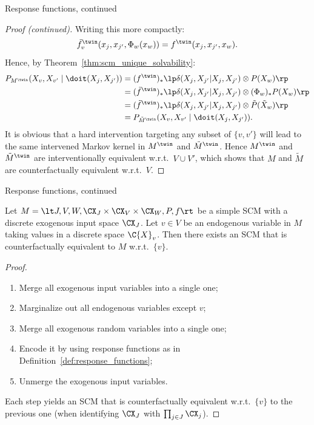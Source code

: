 \begin{frame}{Response functions, continued}
  \begin{proof}[Proof (continued)]
  Writing this more compactly:
  $$\tilde{f}^\twin_v(x_j,x_{j'},\Phi_w(x_w)) = f^\twin(x_j,x_{j'},x_w).$$
  Hence, by Theorem~\ref{thm:scm_unique_solvability}: 
  \begin{align*}
    P_{M^\twin}(X_v,X_{v'} \mid \doit(X_j,X_{j'})) & = (f^\twin)_* \lp \delta(X_j,X_{j'}|X_j,X_{j'}) \otimes P(X_w)\rp \\
    & = (\tilde{f}^\twin)_* \lp \delta(X_j,X_{j'}|X_j,X_{j'}) \otimes (\Phi_w)_* P(X_w) \rp \\
    & = (\tilde{f}^\twin)_* \lp \delta(X_j,X_{j'}|X_j,X_{j'}) \otimes \tilde{P}(\tilde{X}_w) \rp \\
    & = P_{\tilde{M}^\twin}(X_v,X_{v'} \mid \doit(X_j,X_{j'})).
  \end{align*}
  It is obvious that a hard intervention targeting any subset of $\{v,v'\}$ will lead to the same intervened Markov kernel in $M^\twin$ and $\tilde{M}^\twin$.
  Hence $M^\twin$ and $\tilde{M}^\twin$ are interventionally equivalent w.r.t.\ $V \cup V'$, which shows that $M$ and $\tilde{M}$ are counterfactually equivalent w.r.t.\ $V$.
\end{proof}
\end{frame}

\begin{frame}{Response functions, continued}
\begin{Cor}[\ref{cor:counterfactual_equivalence_response_functions}]
  Let $M = \lt J, V, W, \CX_J \times \CX_V \times \CX_W, P, f \rt$ be a simple SCM with a discrete exogenous input space $\CX_J$.
  Let $v \in V$ be an endogenous variable in $M$ taking values in a discrete space $\C{X}_v$.
  Then there exists an SCM that is counterfactually equivalent to $M$ w.r.t.\ $\{v\}$.
\end{Cor}
\begin{proof}
  \begin{enumerate}
    \item Merge all exogenous input variables into a single one;
    \item Marginalize out all endogenous variables except $v$;
    \item Merge all exogenous random variables into a single one;
    \item Encode it by using response functions as in Definition~\ref{def:response_functions};
    \item Unmerge the exogenous input variables.
  \end{enumerate}
  Each step yields an SCM that is counterfactually equivalent w.r.t.\ $\{v\}$ to the previous one (when identifying $\CX_J$ with $\prod_{j\in J} \CX_j$).
\end{proof}
\end{frame}

